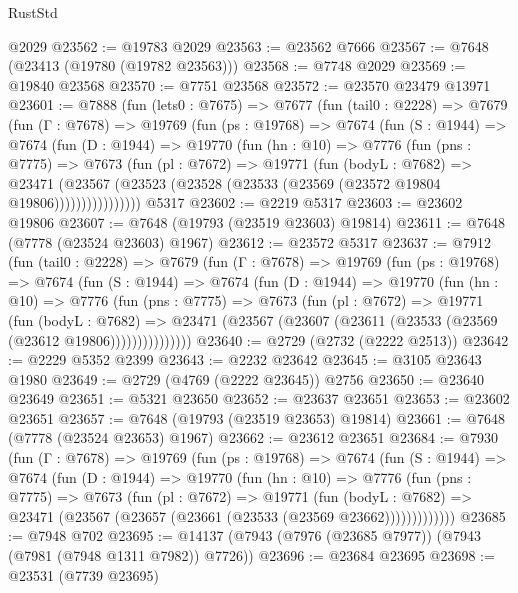 \begin{lexlean}{RustStd}
\begin{coremodule}
    @2029
@23562 := @19783 @2029
@23563 := @23562 @7666
@23567 := @7648 (@23413 (@19780 (@19782 @23563)))
@23568 := @7748 @2029
@23569 := @19840 @23568
@23570 := @7751 @23568
@23572 := @23570 @23479 @13971
@23601 := @7888
    (fun (lets0 : @7675) =>
    @7677
      (fun (tail0 : @2228) =>
      @7679
        (fun (Γ : @7678) =>
        @19769
          (fun (ps : @19768) =>
          @7674
            (fun (S : @1944) =>
            @7674
              (fun (D : @1944) =>
              @19770
                (fun (hn : @10) =>
                @7776
                  (fun (pns : @7775) =>
                  @7673
                    (fun (pl : @7672) =>
                    @19771
                      (fun (bodyL : @7682) =>
                      @23471
                        (@23567
                          (@23523 (@23528 (@23533 (@23569 (@23572 @19804 @19806))))))))))))))))
    @5317
@23602 := @2219 @5317
@23603 := @23602 @19806
@23607 := @7648 (@19793 (@23519 @23603) @19814)
@23611 := @7648 (@7778 (@23524 @23603) @1967)
@23612 := @23572 @5317
@23637 := @7912
    (fun (tail0 : @2228) =>
    @7679
      (fun (Γ : @7678) =>
      @19769
        (fun (ps : @19768) =>
        @7674
          (fun (S : @1944) =>
          @7674
            (fun (D : @1944) =>
            @19770
              (fun (hn : @10) =>
              @7776
                (fun (pns : @7775) =>
                @7673
                  (fun (pl : @7672) =>
                  @19771
                    (fun (bodyL : @7682) =>
                    @23471 (@23567 (@23607 (@23611 (@23533 (@23569 (@23612 @19806)))))))))))))))
@23640 := @2729 (@2732 (@2222 @2513))
@23642 := @2229 @5352 @2399
@23643 := @2232 @23642
@23645 := @3105 @23643 @1980
@23649 := @2729 (@4769 (@2222 @23645)) @2756
@23650 := @23640 @23649
@23651 := @5321 @23650
@23652 := @23637 @23651
@23653 := @23602 @23651
@23657 := @7648 (@19793 (@23519 @23653) @19814)
@23661 := @7648 (@7778 (@23524 @23653) @1967)
@23662 := @23612 @23651
@23684 := @7930
    (fun (Γ : @7678) =>
    @19769
      (fun (ps : @19768) =>
      @7674
        (fun (S : @1944) =>
        @7674
          (fun (D : @1944) =>
          @19770
            (fun (hn : @10) =>
            @7776
              (fun (pns : @7775) =>
              @7673
                (fun (pl : @7672) =>
                @19771
                  (fun (bodyL : @7682) =>
                  @23471 (@23567 (@23657 (@23661 (@23533 (@23569 @23662)))))))))))))
@23685 := @7948 @702
@23695 := @14137 (@7943 (@7976 (@23685 @7977)) (@7943 (@7981 (@7948 @1311 @7982)) @7726))
@23696 := @23684 @23695
@23698 := @23531 (@7739 @23695)

\end{coremodule}
\end{lexlean}
